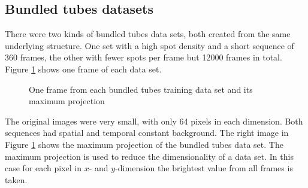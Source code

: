 \subsection{Bundled tubes datasets}
There were two kinds of bundled tubes data sets, both created from the same underlying structure. One set with a high spot density and a short sequence of 360 frames, the other with fewer spots per frame but 12000 frames in total. Figure \ref{bundledtubesHighowDensityFrame} shows one frame of each data set.%
\begin{figure}
\hfill%
\hfill%
	\caption{One frame from each bundled tubes training data set and its maximum projection}%
	\label{bundledtubesHighowDensityFrame}%
\end{figure}

The original images were very small, with only 64 pixels in each dimension. Both sequences had spatial and temporal constant background. The right image in Figure \ref{bundledtubesHighowDensityFrame} shows the maximum projection of the bundled tubes data set. The maximum projection is used to reduce the dimensionality of a data set. In this case for each pixel in $x$- and $y$-dimension the brightest value from all frames is taken. 


